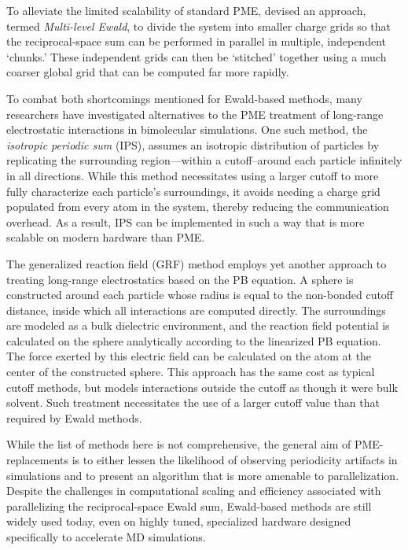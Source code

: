 To alleviate the limited scalability of standard PME,
\citeauthor{Cerutti_JChemTheoryComput_2010_v6_p443} devised an approach, termed
\emph{Multi-level Ewald}, to divide the system into smaller charge grids so that
the reciprocal-space sum can be performed in parallel in multiple, independent
`chunks.' \cite{Cerutti_JChemTheoryComput_2010_v6_p443} These independent grids
can then be `stitched' together using a much coarser global grid that can be
computed far more rapidly.

To combat both shortcomings mentioned for Ewald-based methods, many researchers
have investigated alternatives to the PME treatment of long-range electrostatic
interactions in bimolecular simulations.  One such method, the \emph{isotropic
periodic sum} (IPS), assumes an isotropic distribution of particles by
replicating the surrounding region---within a cutoff--around each particle
infinitely in all directions. \cite{Wu_JChemPhys_2005_v122_p044107} While this
method necessitates using a larger cutoff to more fully characterize each
particle's surroundings, it avoids needing a charge grid populated from every
atom in the system, thereby reducing the communication overhead. As a result,
IPS can be implemented in such a way that is more scalable on modern hardware
than PME.

The generalized reaction field (GRF) method employs yet another approach to
treating long-range electrostatics based on the PB equation. A sphere is
constructed around each particle whose radius is equal to the non-bonded cutoff
distance, inside which all interactions are computed directly. The surroundings
are modeled as a bulk dielectric environment, and the reaction field potential
is calculated on the sphere analytically according to the linearized PB
equation. The force exerted by this electric field can be calculated on the atom
at the center of the constructed sphere. \cite{Tironi_JChemPhys_1995_v102_p5451}
This approach has the same cost as typical cutoff methods, but models
interactions outside the cutoff as though it were bulk solvent. Such treatment
necessitates the use of a larger cutoff value than that required by Ewald
methods.

While the list of methods here is not comprehensive, the general aim of
PME-replacements is to either lessen the likelihood of observing periodicity
artifacts in simulations and to present an algorithm that is more amenable to
parallelization. Despite the challenges in computational scaling and efficiency
associated with parallelizing the reciprocal-space Ewald sum, Ewald-based
methods are still widely used today, even on highly tuned, specialized hardware
designed specifically to accelerate MD simulations. \cite{Anton}

